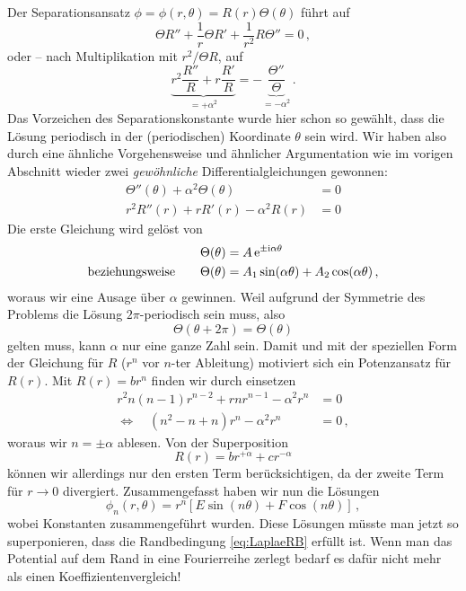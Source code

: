 \documentclass[paper=a4, fontsize=11.0pt, abstractoff, DIV12]{scrartcl}
\begin{document}
Der Separationsansatz $\phi = \phi(r,\theta) = R(r)\Theta(\theta)$ führt auf
\begin{equation}
\Theta R'' + \frac{1}{r}\Theta R' + \frac{1}{r^2} R\Theta'' = 0\, ,
\end{equation}
oder -- nach Multiplikation mit $r^2/\Theta R$, auf
\begin{equation}
\underbrace{r^2 \frac{R''}{R} + r\frac{R'}{R}}_{=+\alpha^2} = - \underbrace{\frac{\Theta''}{\Theta}}_{=-\alpha^2}\,.
\end{equation}
Das Vorzeichen des Separationskonstante wurde hier schon so gewählt, dass
die Lösung periodisch in der (periodischen) Koordinate $\theta$ sein wird.
Wir haben also durch eine ähnliche Vorgehensweise und ähnlicher
Argumentation wie im vorigen Abschnitt wieder zwei \emph{gewöhnliche}
Differentialgleichungen gewonnen:
\begin{align}
\Theta''(\theta) + \alpha^2 \Theta(\theta) &= 0\\
r^2 R''(r) + r R'(r) - \alpha^2 R(r) &= 0
\end{align}
Die erste Gleichung wird gelöst von
\begin{align}
\Theta(\theta) &= A\,{\mathrm{e}}^{\pm \mathrm{i} \alpha \theta}\nonumber\\
\text{beziehungsweise}\qquad \Theta(\theta) &= A_1\sin(\alpha \theta) + A_2\cos(\alpha\theta)\,,
\end{align}
woraus wir eine Ausage über $\alpha$ gewinnen. Weil aufgrund der
Symmetrie des Problems die Lösung $2\pi$-periodisch sein muss, also
\begin{equation}
\Theta(\theta + 2\pi) = \Theta(\theta)
\end{equation}
gelten muss, kann $\alpha$ nur eine ganze Zahl sein. Damit und mit der
speziellen Form der Gleichung für $R$ ($r^n$ vor $n$-ter Ableitung)
motiviert sich ein Potenzansatz für $R(r)$. Mit $R(r) = br^n$ finden wir durch
einsetzen
\begin{align}
r^2 n(n-1)r^{n-2} + r n r^{n-1} - \alpha^2 r^n &= 0\nonumber\\
\Leftrightarrow\quad (n^2 -n +n)r^n - \alpha^2 r^n &= 0\,,
\end{align}
woraus wir $n=\pm\alpha$ ablesen. Von der Superposition
\begin{equation}
R(r) = br^{+\alpha} + cr^{-\alpha}
\end{equation}
können wir allerdings nur den ersten Term berücksichtigen, da der zweite Term
für $r\to0$ divergiert. Zusammengefasst haben wir nun die Lösungen
\begin{equation}
\phi_n(r, \theta) = r^n\left[E\sin(n\theta) + F\cos(n\theta)\right]\,,
\end{equation}
wobei Konstanten zusammengeführt wurden. Diese Lösungen müsste man jetzt so
superponieren, dass die Randbedingung \eqref{eq:LaplaeRB} erfüllt ist. Wenn
man das Potential auf dem Rand in eine Fourierreihe zerlegt bedarf es dafür
nicht mehr als einen Koeffizientenvergleich!
\end{document}
